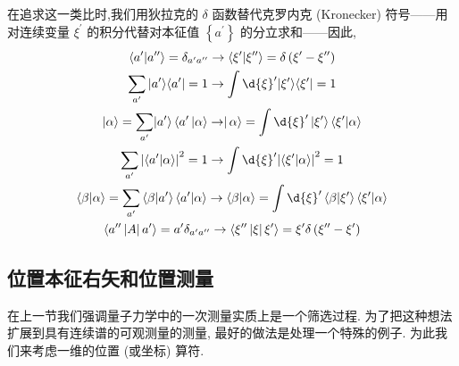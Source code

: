 	在追求这一类比时,我们用狄拉克的 $\delta$ 函数替代克罗内克 (Kronecker) 符号——用对连续变量 ${\xi }^{\prime }$ 的积分代替对本征值 $\left\{ {a}^{\prime }\right\}$ 的分立求和——因此,
	\begin{equation}
		\begin{gathered}
			\left\langle {{a}^{\prime } | {a}^{\prime \prime }}\right\rangle = {\delta }_{{a}^{\prime }{a}^{\prime \prime }}\rightarrow \left\langle {{\xi }^{\prime } | {\xi }^{\prime \prime }}\right\rangle = \delta \left( {{\xi }^{\prime } - {\xi }^{\prime \prime }}\right)\\
			\mathop{\sum }\limits_{{a}^{\prime }}| {a}^{\prime }\rangle \langle {{a}^{\prime } | = 1\rightarrow \int \d{\xi }^{\prime } | {\xi }^{\prime }}\rangle \langle {\xi }^{\prime }| = 1\\
			| {\alpha \rangle = \mathop{\sum }\limits_{{a}^{\prime }}}| {a}^{\prime }\rangle \left\langle {{a}^{\prime }\left| {\alpha \rangle\rightarrow }\right| \alpha }\right\rangle = \int \d{\xi }^{\prime }\left| {\xi }^{\prime }\right\rangle \left\langle {{\xi }^{\prime } | \alpha }\right\rangle\\
			\mathop{\sum }\limits_{{a}^{\prime }}{\left| \left\langle {a}^{\prime } | \alpha \right\rangle \right| }^{2} = 1\rightarrow \int \d{\xi }^{\prime }{\left| \left\langle {\xi }^{\prime } | \alpha \right\rangle \right| }^{2} = 1\\
			\langle \beta | \alpha \rangle = \mathop{\sum }\limits_{{a}^{\prime }}\left\langle {\beta | {a}^{\prime }}\right\rangle \left\langle {{a}^{\prime } | \alpha }\right\rangle \rightarrow \langle \beta | \alpha \rangle = \int \d{\xi }^{\prime }\left\langle {\beta | {\xi }^{\prime }}\right\rangle \left\langle {{\xi }^{\prime } | \alpha }\right\rangle\\
			\left\langle {{a}^{\prime \prime }\left| A\right| {a}^{\prime }}\right\rangle = {a}^{\prime }{\delta }_{{a}^{\prime }{a}^{\prime \prime }} \rightarrow \left\langle {{\xi }^{\prime \prime }\left| \xi \right| {\xi }^{\prime }}\right\rangle = {\xi }^{\prime }\delta \left( {{\xi }^{\prime \prime } - {\xi }^{\prime }}\right)\\
		\end{gathered}
	\end{equation}
	\subsection{位置本征右矢和位置测量}
	在上一节我们强调量子力学中的一次测量实质上是一个筛选过程. 为了把这种想法扩展到具有连续谱的可观测量的测量, 最好的做法是处理一个特殊的例子. 为此我们来考虑一维的位置 (或坐标) 算符.
	
